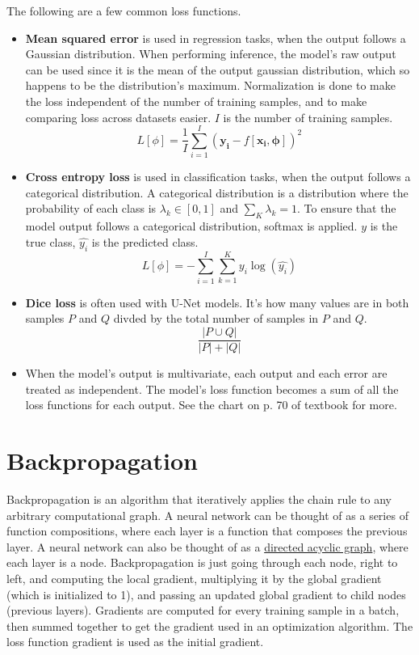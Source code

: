 \documentclass{article}
\begin{document}
The following are a few common loss functions.
\begin{itemize}
\item \textbf{Mean squared error} is used in regression tasks, when the output follows a Gaussian distribution. When performing inference, the model's raw output can be used since it is the mean of the output gaussian distribution, which so happens to be the distribution's maximum. Normalization is done to make the loss independent of the number of training samples, and to make comparing loss across datasets easier. $I$ is the number of training samples.
\[ L[\phi] = \frac{1}{I} \sum_{i = 1}^{I} (\mathbf{y_i} - f[\mathbf{x_i}, \boldsymbol{\phi}])^2 \]

\item \textbf{Cross entropy loss} is used in classification tasks, when the output follows a categorical distribution. A categorical distribution is a distribution where the probability of each class is $\lambda_k \in [0, 1]$ and $\sum_{K} \lambda_k = 1$. To ensure that the model output follows a categorical distribution, softmax is applied. $y$ is the true class, $\hat{y_i}$ is the predicted class.
\[ L[\phi] = -\sum_{i = 1}^{I}\sum_{k=1}^{K} y_i \log(\hat{y_i}) \]

\item \textbf{Dice loss} is often used with U-Net models. It's how many values are in both samples $P$ and $Q$ divded by the total number of samples in $P$ and $Q$.
\[ \frac{|P \cup Q|}{|P| + |Q|} \]

\item When the model's output is multivariate, each output and each error are treated as independent. The model's loss function becomes a sum of all the loss functions for each output. See the chart on p. 70 of textbook for more.
\end{itemize}

\section{Backpropagation}
Backpropagation is an algorithm that iteratively applies the chain rule to any arbitrary computational graph. A neural network can be thought of as a series of function compositions, where each layer is a function that composes the previous layer. A neural network can also be thought of as a \href{https://www.youtube.com/watch?v=i94OvYb6noo}{directed acyclic graph}, where each layer is a node. Backpropagation is just going through each node, right to left, and computing the local gradient, multiplying it by the global gradient (which is initialized to 1), and passing an updated global gradient to child nodes (previous layers). Gradients are computed for every training sample in a batch, then summed together to get the gradient used in an optimization algorithm. The loss function gradient is used as the initial gradient.
\end{document}
